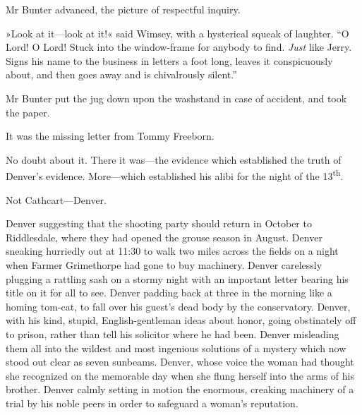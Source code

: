 Mr Bunter advanced, the picture of respectful inquiry.

»Look at it\allowbreak---\allowbreak look at it!« said Wimsey, with a hysterical squeak of laughter. \enquote{O Lord! O Lord! Stuck into the window-frame for anybody to find. \textit{Just} like Jerry. Signs his name to the business in letters a foot long, leaves it conspicuously about, and then goes away and is chivalrously silent.}

Mr Bunter put the jug down upon the washstand in case of accident, and took the paper.

It was the missing letter from Tommy Freeborn.

No doubt about it. There it was\allowbreak---\allowbreak the evidence which established the truth of Denver's evidence. More\allowbreak---\allowbreak which established his alibi for the night of the 13\textsuperscript{th}.

Not Cathcart\allowbreak---\allowbreak Denver.

Denver suggesting that the shooting party should return in October to Riddlesdale, where they had opened the grouse season in August.  Denver sneaking hurriedly out at 11:30 to walk two miles across the fields on a night when Farmer Grimethorpe had gone to buy machinery.  Denver carelessly plugging a rattling sash on a stormy night with an important letter bearing his title on it for all to see. Denver padding back at three in the morning like a homing tom-cat, to fall over his guest's dead body by the conservatory. Denver, with his kind, stupid, English-gentleman ideas about honor, going obstinately off to prison, rather than tell his solicitor where he had been. Denver misleading them all into the wildest and most ingenious solutions of a mystery which now stood out clear as seven sunbeams. Denver, whose voice the woman had thought she recognized on the memorable day when she flung herself into the arms of his brother. Denver calmly setting in motion the enormous, creaking machinery of a trial by his noble peers in order to safeguard a woman's reputation.

